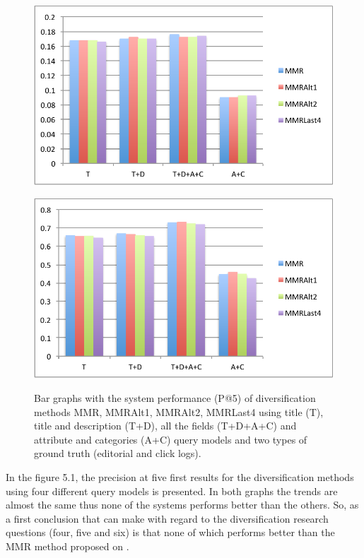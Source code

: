 \begin{figure}[H]
\centering
\begin{minipage}{.5\textwidth}
	\includegraphics[width=.9\linewidth]{../images/MMRMethodsP@5.pdf}
	\label{fig:acc-ns}
\end{minipage}%
\begin{minipage}{.5\textwidth}
	\centering
	\includegraphics[width=.9\linewidth]{../images/MMRMethodsP@5Relevance.pdf}
	\label{fig:acc-ns}
\end{minipage}%
\caption{Bar graphs with the system performance (P@5) of diversification methods MMR, MMRAlt1, MMRAlt2, MMRLast4 using title (T), title and description (T+D), all the fields (T+D+A+C) and attribute and categories (A+C) query models and two types of ground truth (editorial and click logs).
}
\end{figure}


In the figure 5.1, the precision at five first results for the diversification methods using four different query models is presented. In both graphs the trends are almost the same thus none of the systems performs better than the others. So, as a first conclusion that can make with regard to the diversification research questions (four, five and six) is that none of which performs better than the MMR method proposed on \cite{CarbonellGoldstein}.


